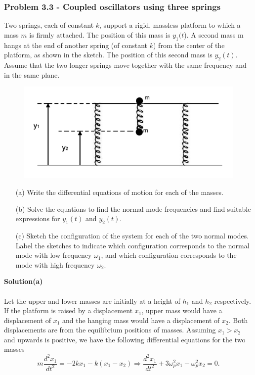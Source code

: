 \documentclass[12pt,a4paper]{article}
\begin{document}
\subsubsection*{Problem 3.3 - Coupled oscillators using three springs}
Two springs, each of constant $k$, support a rigid, massless platform to which a mass $m$ is firmly attached. The position of this mass is $y_1(t$). A second mass m hangs at the end of another spring (of constant $k$) from the center of the platform, as shown in the sketch. The position of this second mass is $y_2(t)$. Assume that the two longer springs move together with the same frequency and in the same plane.
\begin{figure}[h]
    \centering
    \includegraphics[width=0.6\linewidth]{figs/fig_prob_3.3.png}
\end{figure}
\begin{enumerate}
    \item[(a)]Write the differential equations of motion for each of the masses.
    \item[(b)]Solve the equations to find the normal mode frequencies and find suitable expressions for $y_1(t)$ and $y_2(t)$.
    \item[(c)]Sketch the configuration of the system for each of the two normal modes. Label the sketches to indicate which configuration corresponds to the normal mode with low frequency $\omega_1$, and which configuration corresponds to the mode with high frequency $\omega_2$.
\end{enumerate}
\textbf{Solution(a)}
\\
\\Let the upper and lower masses are initially at a height of $h_1$ and $h_2$ respectively. If the platform is raised by a displacement $x_1$, upper mass would have a displacement of $x_1$ and the hanging mass would have a displacement of $x_2$. Both displacements are from the equilibrium positions of masses. Assuming $x_1>x_2$ and upwards is positive, we have the following differential equations for the two masses
\begin{equation}
    m\frac{d^2x_1}{dt^2}=-2kx_1-k(x_1-x_2)\Rightarrow\frac{d^2x_1}{dt^2}+3\omega_p^2x_1-\omega_p^2x_2=0.
\end{equation}
\end{document}

